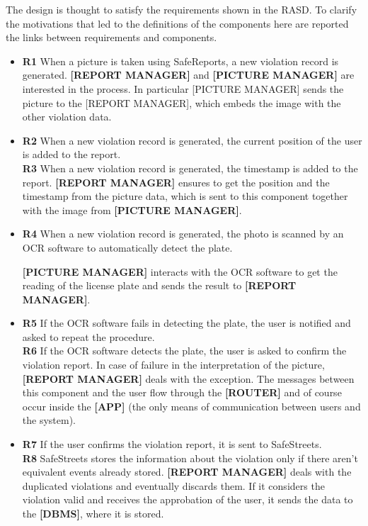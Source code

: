 \documentclass[./main.tex]{subfiles}
\begin{document}
The design is thought to satisfy the requirements shown in the RASD. To clarify the motivations that led to the definitions of the components here are reported the links between requirements and components.


\begin{itemize}
\item
  \textbf{R1} When a picture is taken using SafeReports, a new violation
  record is generated.
    \subitem 
    \textbf{[REPORT MANAGER]} and \textbf{[PICTURE MANAGER]} are interested in the process. In particular [PICTURE MANAGER] sends the picture to the [REPORT MANAGER], which embeds the image with the other violation data.
  	
\item
  \textbf{R2} When a new violation record is generated, the current
  position of the user is added to the report.\\
  \textbf{R3} When a new violation record is generated, the timestamp is
  added to the report.
  \subitem
    \textbf{[REPORT MANAGER]} ensures to get the position and the timestamp from the picture data, which is sent to this component together with the image from \textbf{[PICTURE MANAGER]}.
  
\item
  \textbf{R4} When a new violation record is generated, the photo is
  scanned by an OCR software to automatically detect the plate.
    
   \subitem
      \textbf{[PICTURE MANAGER]} interacts with the OCR software to get the reading of the license plate and sends the result to \textbf{[REPORT MANAGER]}.
  
\item
  \textbf{R5} If the OCR software fails in detecting the plate, the user
  is notified and asked to repeat the procedure.\\
  \textbf{R6} If the OCR software detects the plate, the user is asked
  to confirm the violation report.
  \subitem
    In case of failure in the interpretation of the picture, \textbf{[REPORT MANAGER]} deals with the exception. The messages between this component and the user flow through the \textbf{[ROUTER]} and of course occur inside the \textbf{[APP]} (the only means of communication between users and the system).
  
\item
  \textbf{R7} If the user confirms the violation report, it is sent to
  SafeStreets.\\
  \textbf{R8} SafeStreets stores the information about the violation
  only if there aren't equivalent events already stored.
   \subitem
   \textbf{[REPORT MANAGER]} deals with the duplicated violations and eventually discards them. If it considers the violation valid and receives the approbation of the user, it sends the data to the \textbf{[DBMS]}, where it is stored.
  
\end{itemize}
\end{document}
